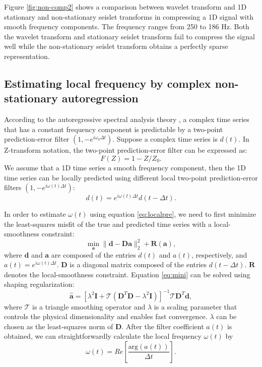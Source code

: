 Figure \ref{fig:non-comp2} shows a comparison between  wavelet transform and  1D stationary and non-stationary seislet transforms in compressing a 1D signal with smooth frequency components. The frequency ranges from 250 to 186 Hz. Both the wavelet transform and stationary seislet transform fail to compress the signal well while the non-stationary seislet transform obtains a perfectly sparse representation.



\subsection{Estimating local frequency by complex non-stationary autoregression}
According to the autoregressive spectral analysis theory \cite[]{marple}, a complex time series that has a constant frequency component is predictable by a two-point prediction-error filter $(1,-e^{i\omega_0\Delta t})$. Suppose a complex time series is $d(t)$. In Z-transform notation, the two-point prediction-error filter can be expressed as:
\begin{equation}
\label{eq:twopre}
F(Z)=1-Z/Z_0.
\end{equation} 
We assume that a 1D time series  a smooth frequency component, then the 1D time series can be locally predicted using different local two-point prediction-error filters $(1,-e^{i\omega(t)\Delta t})$:
\begin{equation}
\label{eq:localpre}
d(t)=e^{i\omega(t)\Delta t}d(t-\Delta t).
\end{equation}

In order to estimate $\omega(t)$ using equation \ref{eq:localpre}, we need to first minimize the least-squares misfit of the true and predicted time series with a local-smoothness constraint:
\begin{equation}
\label{eq:mini}
\min_{\mathbf{a}} \parallel \mathbf{d} - \mathbf{D} \mathbf{a} \parallel_2^2 + \mathbf{R}(\mathbf{a}),
\end{equation}
where $\mathbf{d}$ and $\mathbf{a}$ are  composed of the entries $d(t)$ and $a(t)$, respectively, and $a(t)=e^{i\omega(t)\Delta t}$. $\mathbf{D}$ is a diagonal matrix composed of the entries $d(t-\Delta t)$. $\mathbf{R}$ denotes the local-smoothness constraint. Equation \ref{eq:mini} can be solved using shaping regularization:
\begin{equation}
\hat{\mathbf{a}} = [\lambda^2\mathbf{I}+\mathcal{T}(\mathbf{D}^T\mathbf{D}-\lambda^2\mathbf{I})]^{-1}\mathcal{T}\mathbf{D}^T\mathbf{d},
\end{equation}
where $\mathcal{T}$ is a triangle smoothing operator and $\lambda$ is a scaling parameter that controls the physical dimensionality and enables fast convergence. $\lambda$ can be chosen as the least-squares norm of $\mathbf{D}$. After the filter coefficient $a(t)$ is obtained, we can straightforwardly calculate the local  frequency $\omega(t)$ by
\begin{equation}
\label{eq:circ}
\omega(t) = Re\left[\frac{\mbox{arg}(a(t))}{\Delta t}\right].
\end{equation}

